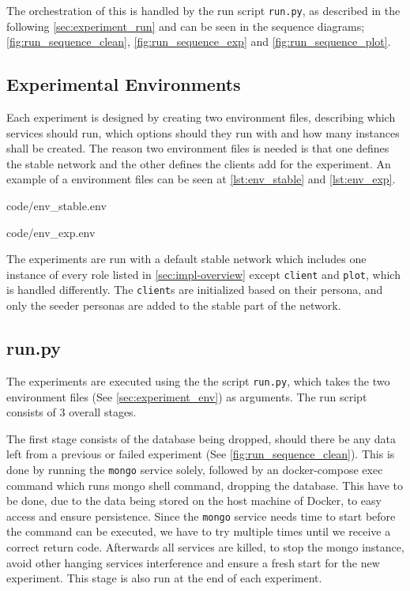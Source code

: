 The orchestration of this is handled by the run script \texttt{run.py}, as described in the following \autoref{sec:experiment_run} and can be seen in the sequence diagrams; \autoref{fig:run_sequence_clean}, \ref{fig:run_sequence_exp} and \ref{fig:run_sequence_plot}.

\subsection{Experimental Environments}
\label{sec:experiment_env}
Each experiment is designed by creating two environment files, describing which services should run, which options should they run with and how many instances shall be created. The reason two environment files is needed is that one defines the stable network and the other defines the clients add for the experiment. An example of a environment files can be seen at \autoref{lst:env_stable} and \ref{lst:env_exp}.

\noindent\begin{minipage}[t]{.35\textwidth}

                {code/env_stable.env}
\end{minipage}
\hfill
\begin{minipage}[t]{.52\textwidth}

                {code/env_exp.env}
\end{minipage}\bigskip

The experiments are run with a default stable network which includes one instance of every role listed in \autoref{sec:impl-overview} except \texttt{client} and \texttt{plot}, which is handled differently. The \texttt{client}s are initialized based on their persona, and only the seeder personas are added to the stable part of the network.

\subsection{run.py}
\label{sec:experiment_run}
The experiments are executed using the the script \texttt{run.py}, which takes the two environment files (See \autoref{sec:experiment_env}) as arguments. The run script consists of 3 overall stages.

The first stage consists of the database being dropped, should there be any data left from a previous or failed experiment (See \autoref{fig:run_sequence_clean}). This is done by running the \texttt{mongo} service solely, followed by an docker-compose exec command which runs mongo shell command, dropping the database. This have to be done, due to the data being stored on the host machine of Docker, to easy access and ensure persistence. Since the \texttt{mongo} service needs time to start before the command can be executed, we have to try multiple times until  we receive a correct return code. Afterwards all services are killed, to stop the mongo instance, avoid other hanging services interference and ensure a fresh start for the new experiment. This stage is also run at the end of each experiment.


